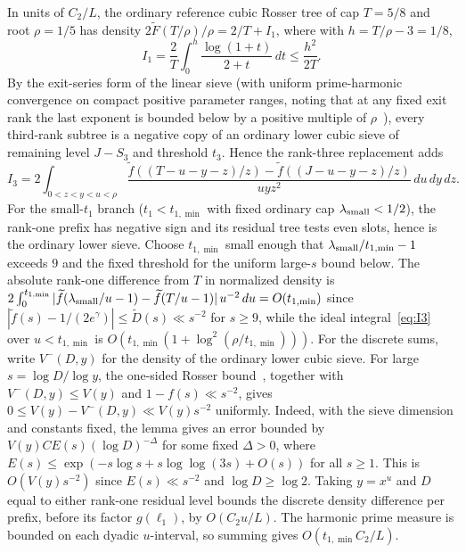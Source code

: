 \documentclass[11pt,reqno]{amsart}
\theoremstyle{remark}
\newcommand{\normF}{\widetilde{F}}
\newcommand{\normf}{\widetilde{f}}
\newcommand{\normD}{\widetilde{D}}
\numberwithin{equation}{section}
\begin{document}
In units of $C_2/L$, the ordinary reference cubic Rosser tree of cap $T = 5/8$ and root $\rho = 1/5$ has density $2\normF(T/\rho)/\rho = 2/T + I_1$, where with $h = T/\rho - 3 = 1/8$,
\begin{equation}\label{eq:I1}
I_1 = \frac{2}{T}\int_0^h \frac{\log(1+t)}{2+t}\,dt \le \frac{h^2}{2T}.
\end{equation}
By the exit-series form of the linear sieve (with uniform prime-harmonic convergence on compact positive parameter ranges, noting that at any fixed exit rank the last exponent is bounded below by a positive multiple of $\rho$~\cite{Iwaniec1980,FriedlanderIwaniec2010}), every third-rank subtree is a negative copy of an ordinary lower cubic sieve of remaining level $J - S_3$ and threshold $t_3$. Hence the rank-three replacement adds
\begin{equation}\label{eq:I3}
I_3 = 2\int_{0 < z < y < u < \rho}
\frac{\normf((T-u-y-z)/z) - \normf((J-u-y-z)/z)}{uy z^2}\,du\,dy\,dz.
\end{equation}
For the small-$t_1$ branch ($t_1 < t_{1,\min}$ with fixed ordinary cap $\lambda_{\rm small} < 1/2$), the rank-one prefix has negative sign and its residual tree tests even slots, hence is the ordinary lower sieve. Choose $t_{1,\min}$ small enough that $\lambda_{\rm small}/t_{1,\min}-1$ exceeds $9$ and the fixed threshold for the uniform large-$s$ bound below. The absolute rank-one difference from $T$ in normalized density is $2\int_0^{t_{1,\min}}|\normf(\lambda_{\rm small}/u-1)-\normf(T/u-1)|\,u^{-2}\,du = O(t_{1,\min})$ since $|\normf(s) - 1/(2e^\gamma)| \le \normD(s) \ll s^{-2}$ for $s \ge 9$, while the ideal integral~\eqref{eq:I3} over $u < t_{1,\min}$ is $O(t_{1,\min}(1+\log^2(\rho/t_{1,\min})))$. For the discrete sums, write $V^-(D,y)$ for the density of the ordinary lower cubic sieve. For large $s=\log D/\log y$, the one-sided Rosser bound~\cite[Lemma~14.7]{SuzukiRosser}, together with $V^-(D,y)\le V(y)$ and $1-f(s)\ll s^{-2}$, gives $0\le V(y)-V^-(D,y)\ll V(y)s^{-2}$ uniformly. Indeed, with the sieve dimension and constants fixed, the lemma gives an error bounded by $V(y)CE(s)(\log D)^{-\Delta}$ for some fixed $\Delta>0$, where $E(s)\le \exp(-s\log s+s\log\log(3s)+O(s))$ for all $s\ge1$. This is $O(V(y)s^{-2})$ since $E(s)\ll s^{-2}$ and $\log D\ge\log 2$. Taking $y=x^u$ and $D$ equal to either rank-one residual level bounds the discrete density difference per prefix, before its factor $g(\ell_1)$, by $O(C_2 u/L)$. The harmonic prime measure is bounded on each dyadic $u$-interval, so summing gives $O(t_{1,\min}C_2/L)$.
\end{document}

